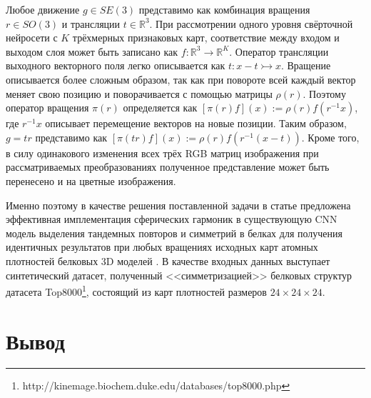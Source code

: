 \documentclass[12pt,twosides]{article}
\begin{document}
	Любое движение $g\in SE(3)$ представимо как комбинация вращения $r\in SO(3)$ и трансляции $t\in\mathbb{R}^3$. При рассмотрении одного уровня свёрточной нейросети с $K$ трёхмерных признаковых карт, соответствие между входом и выходом слоя может быть записано как $f:\mathbb{R}^3\rightarrow\mathbb{R}^K$. Оператор трансляции выходного векторного поля легко описывается как $t:x-t\rightarrowtail x$. Вращение описывается более сложным образом, так как при повороте всей каждый вектор меняет свою позицию и поворачивается с помощью матрицы $\rho(r)$. Поэтому оператор вращения $\pi(r)$ определяется как $[\pi(r)f](x):=\rho(r)f(r^{-1}x)$, где $r^{-1}x$ описывает перемещение векторов на новые позиции. Таким образом, $g=tr$ представимо как $[\pi(tr)f](x):=\rho(r)f(r^{-1}(x-t))$. Кроме того, в силу одинакового изменения всех трёх RGB матриц изображения при рассматриваемых преобразованиях полученное представление может быть перенесено и на цветные изображения.
	
	 Именно поэтому в качестве решения поставленной задачи в статье предложена эффективная имплементация сферических гармоник в существующую CNN модель выделения тандемных повторов и симметрий в белках для получения идентичных результатов при любых вращениях исходных карт атомных плотностей белковых 3D моделей \cite{DeepSymmetry18}. В качестве входных данных выступает синтетический датасет, полученный <<симметризацией>> белковых структур датасета Top8000\footnote{ http://kinemage.biochem.duke.edu/databases/top8000.php}, состоящий из карт плотностей размеров $24\times24\times24$. 
	 
	\section{Вывод}

	
	
	
\end{document}
